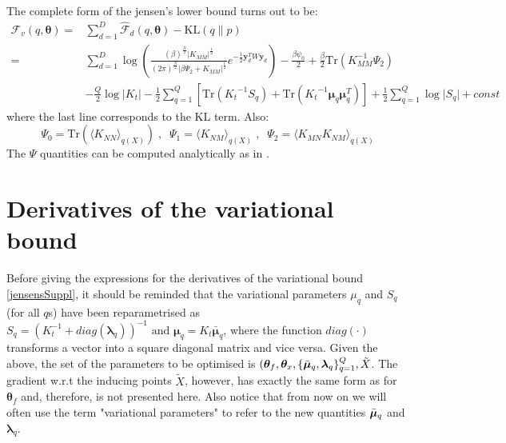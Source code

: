 \documentclass{article} %
\begin{document}
\par
The complete form of the jensen's lower bound turns out to be:
\begin{align}
\mathcal{F}_v(q, \boldsymbol \theta) = {}& \sum_{d=1}^{D} 
	\hat{\mathcal{F}}_d(q, \boldsymbol \theta) -  \text{KL}(q \parallel p) \nonumber \\
	= {}& 
	\sum_{d=1}^{D} 
		\log \left( 
		\frac{(\beta)^{\frac{N}{2}} \vert \mathit{K_{MM}} \vert ^\frac{1}{2} }
			 {(2\pi)^{\frac{N}{2}} \vert \beta \Psi_2 + \mathit{K_{MM}}  \vert ^\frac{1}{2} } 	
		 e^{-\frac{1}{2} \mathbf{y}^{T}_{d} W \mathbf{y}_d} 
		 \right) -
		 \frac{\beta \psi_0}{2} + \frac{\beta}{2} 
		 \text{Tr} \left( \mathit{K_{MM}^{-1}} \Psi_2 \right)  \nonumber \\
{}&	- \frac{Q}{2} \log \vert \mathit{K_t} \vert - \frac{1}{2} \sum_{q=1}^{Q}
	  \left[ \text{Tr} \left( \mathit{K_t}^{-1} \mathit{S_q} \right)	  
	  	   + \text{Tr} \left( \mathit{K_t}^{-1} \boldsymbol \mu_q \boldsymbol \mu_q^T \right) \right] 
	 + \frac{1}{2} \sum_{q=1}^Q \log \vert \mathit{S_q} \vert + const  \label{boundFinal}
\end{align}
where the last line corresponds to the KL term. Also:
\begin{equation}
\label{psis}
\Psi_0 = \text{Tr}(\langle \mathit{K_{NN}} \rangle_{q(\mathit{X})}) \;, \;\;
\Psi_1 = \langle \mathit{K_{NM}} \rangle_{q(\mathit{X})} \;, \;\;
\Psi_2 = \langle \mathit{K_{MN}} \mathit{K_{NM}} \rangle_{q(\mathit{X})}
\end{equation}
The $\Psi$ quantities can be computed analytically as in \cite{BayesianGPLVM}.



\section{Derivatives of the variational bound}
Before giving the expressions for the derivatives of the variational bound \eqref{jensensSuppl},
it should be reminded that the variational parameters $\mu_q$ and $S_q$ (for all $q$s) have been
reparametrised as $S_q = \left( \mathit{K}_t^{-1} + diag(\boldsymbol \lambda_q) \right)^{-1}  \text{ and }   \boldsymbol \mu_q = K_t \bar{\boldsymbol \mu}_q$, where the function $diag(\cdot)$ transforms a vector into a square diagonal matrix and vice versa. Given the above, the set of the parameters to be optimised is 
$( \boldsymbol \theta_f, \boldsymbol \theta_x, \{ \bar{\boldsymbol \mu}_q, \boldsymbol \lambda_q \}_{q=1}^Q, \tilde{X}$. The gradient w.r.t the inducing points $\tilde{X}$, however, has exactly the same form as for $\boldsymbol \theta_f$ and, therefore, is not presented here. Also notice that from now on we will often use the term "variational parameters" to refer to the new quantities $\bar{\boldsymbol \mu}_q$ and $\boldsymbol \lambda_q$. 
\end{document}
